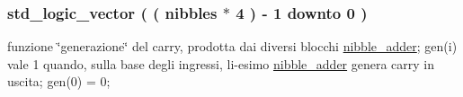 \subsubsection[{\texorpdfstring{sum\+\_\+tmp}{sum_tmp}}]{ {\bfseries \textcolor{vhdlchar}{std\+\_\+logic\+\_\+vector}\textcolor{vhdlchar}{ }\textcolor{vhdlchar}{(}\textcolor{vhdlchar}{ }\textcolor{vhdlchar}{(}\textcolor{vhdlchar}{ }\textcolor{vhdlchar}{ }\textcolor{vhdlchar}{ }\textcolor{vhdlchar}{ }{\bfseries {\bf nibbles}} \textcolor{vhdlchar}{$\ast$}\textcolor{vhdlchar}{ } \textcolor{vhdldigit}{4} \textcolor{vhdlchar}{ }\textcolor{vhdlchar}{)}\textcolor{vhdlchar}{ }\textcolor{vhdlchar}{-\/}\textcolor{vhdlchar}{ } \textcolor{vhdldigit}{1} \textcolor{vhdlchar}{ }\textcolor{vhdlchar}{downto}\textcolor{vhdlchar}{ }\textcolor{vhdlchar}{ } \textcolor{vhdldigit}{0} \textcolor{vhdlchar}{ }\textcolor{vhdlchar}{)}\textcolor{vhdlchar}{ }} \hspace{0.3cm}{\ttfamily [Signal]}}\hypertarget{group___carry_loockahead_ga3c7f619aa6449e06bf0dd48a7db92b84}{}\label{group___carry_loockahead_ga3c7f619aa6449e06bf0dd48a7db92b84}
funzione \char`\"{}generazione\char`\"{} del carry, prodotta dai diversi blocchi \hyperlink{classnibble__adder}{nibble\+\_\+adder}; gen(i) vale 1 quando, sulla base degli ingressi, l\textquotesingle{}i-\/esimo \hyperlink{classnibble__adder}{nibble\+\_\+adder} genera carry in uscita; gen(0) = \textquotesingle{}0\textquotesingle{}; 